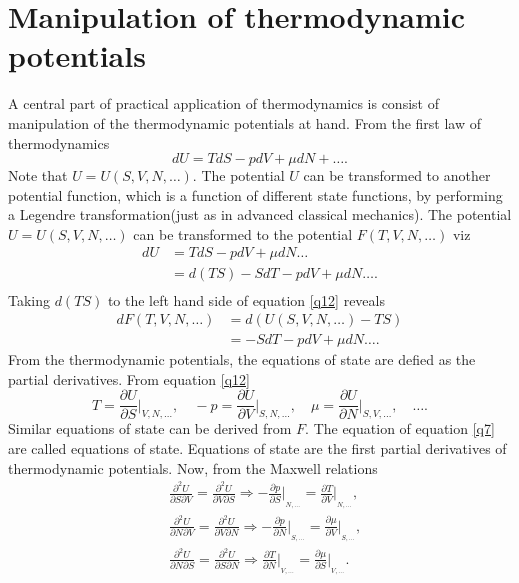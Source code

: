 \section{Manipulation of thermodynamic potentials}	
A central part of practical application of thermodynamics is consist of manipulation of the thermodynamic potentials at hand. From the first law of thermodynamics
\begin{equation}
	dU=TdS-pdV+\mu dN+\dots.
	\label{qq1}
\end{equation} 
Note that $U=U(S,V,N,\dots)$. The potential $U$ can be transformed to another potential function, which is a function of different state functions, by performing a Legendre transformation(just as in advanced classical mechanics). The potential $U=U(S,V,N,\dots)$ can be transformed to the potential $F(T,V,N,\dots)$ viz
\begin{equation}
	\begin{split}
		dU&=TdS-pdV+\mu dN\dots\\
		&=d(TS)-SdT-pdV+\mu dN\dots.\\
	\end{split}
	\label{q12}
\end{equation} 
Taking $d(TS)$ to the left hand side of equation \eqref{q12} reveals
\begin{equation}
	\begin{split}
		dF(T,V,N,\dots)&=d(U(S,V,N,\dots)-TS)\\
		&=-SdT-pdV+\mu dN\dots.
	\end{split}
\end{equation} 
From the thermodynamic potentials, the equations of state are defied as the partial derivatives. From equation \eqref{q12}
\begin{equation}
	T=\frac{\partial U}{\partial S}\bigg|_{V,N,\dots}, \quad -p=\frac{\partial U}{\partial V}\bigg|_{S,N,\dots}, \quad \mu=\frac{\partial U}{\partial N}\bigg|_{S,V,\dots}, \quad \dots.
	\label{q7}
\end{equation} 
Similar equations of state can be derived from $F$. The equation of equation \eqref{q7} are called equations of state. Equations of state are the first partial derivatives of thermodynamic potentials. Now, from the Maxwell relations
\begin{equation}
	\begin{split}
		&\frac{\partial^2 U}{\partial S\partial V}=\frac{\partial^2 U}{\partial V\partial S}\Rightarrow -\frac{\partial p}{\partial S}\bigg|_{_{N,\dots}}=\frac{\partial T}{\partial V}\bigg|_{_{N,\dots}},\\
		&\frac{\partial^2 U}{\partial N\partial V}=\frac{\partial^2 U}{\partial V\partial N}\Rightarrow -\frac{\partial p}{\partial N}\bigg|_{_{S,\dots}}=\frac{\partial \mu}{\partial V}\bigg|_{_{S,\dots}},\\
		&\frac{\partial^2 U}{\partial N\partial S}=\frac{\partial^2 U}{\partial S\partial N}\Rightarrow \frac{\partial T}{\partial N}\bigg|_{_{V,\dots}}=\frac{\partial \mu}{\partial S}\bigg|_{_{V,\dots}}.\\
	\end{split}
	\label{q8}
\end{equation} 
